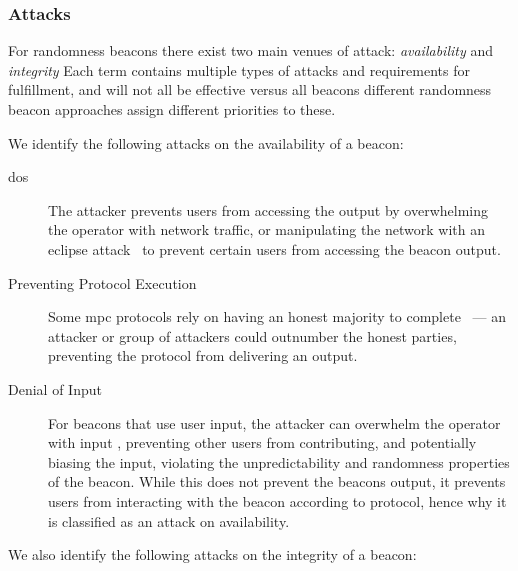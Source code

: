 
\subsubsection{Attacks}\label{ssub:security_objectives}
For randomness beacons there exist two main venues of attack: \emph{availability} and \emph{integrity}
Each term contains multiple types of attacks and requirements for fulfillment, and will not all be effective versus all beacons different randomness beacon approaches assign different priorities to these.

We identify the following attacks on the availability of a beacon:

\begin{description}
    \item[\Acrfull{dos}] The attacker prevents users from accessing the output by overwhelming the operator with network traffic, or manipulating the network with an eclipse attack~\cite{Singh06eclipseattacks} to prevent certain users from accessing the beacon output.
    \item[Preventing Protocol Execution] Some \gls{mpc} protocols rely on having an honest majority to complete~\cite{cascudo2017scrape} --- an attacker or group of attackers could outnumber the honest parties, preventing the protocol from delivering an output.
    \item[Denial of Input] For beacons that use user input, the attacker can overwhelm the operator with input , preventing other users from contributing, and potentially biasing the input, violating the unpredictability and randomness properties of the beacon.
    While this does not prevent the beacons output, it prevents users from interacting with the beacon according to protocol, hence why it is classified as an attack on availability.
\end{description}

\noindent%
We also identify the following attacks on the integrity of a beacon:

